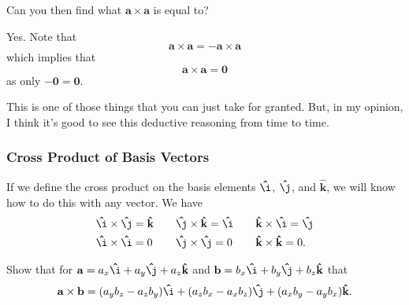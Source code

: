         \begin{question}
        Can you then find what $\mathbf{a}\times \mathbf{a}$ is equal to?
        \end{question}
        
        \begin{question}
        Yes.  Note that
        \[
        \mathbf{a}\times \mathbf{a}=-\mathbf{a}\times \mathbf{a}
        \]
        which implies that
        \[
        \mathbf{a}\times \mathbf{a}=\mathbf{0}
        \]
        as only $-\mathbf{0}=\mathbf{0}.$
        \end{question}
        
        \begin{remark}
        This is one of those things that you can just take for granted. But, in my opinion, I think it's good to see this deductive reasoning from time to time.
        \end{remark}
        
        \subsubsection{Cross Product of Basis Vectors}
        If we define the cross product on the basis elements $\mathbf{\hat{\i}}$, $\mathbf{\hat{\j}}$, and $\mathbf{\hat{k}}$, we will know how to do this with any vector.  We have
        \begin{align*}
            &\mathbf{\hat{\i}}\times \mathbf{\hat{\j}} = \mathbf{\hat{k}} &\quad &\mathbf{\hat{\j}}\times \mathbf{\hat{k}} = \mathbf{\hat{\i}} &\quad
            &\mathbf{\hat{k}}\times \mathbf{\hat{\i}} = \mathbf{\hat{\j}}\\
            &\mathbf{\hat{\i}}\times \mathbf{\hat{\i}} = 0 &\quad
            &\mathbf{\hat{\j}}\times \mathbf{\hat{\j}} = 0 &\quad
            &\mathbf{\hat{k}}\times \mathbf{\hat{k}} = 0.
        \end{align*}
        
        \begin{exercise}
        Show that for $\mathbf{a}=a_x \mathbf{\hat{\i}} + a_y\mathbf{\hat{\j}} + a_z \mathbf{\hat{k}}$ and $\mathbf{b}=b_x \mathbf{\hat{\i}} + b_y\mathbf{\hat{\j}} + b_z \mathbf{\hat{k}}$ that
        \[
        \mathbf{a}\times \mathbf{b} = (a_yb_z-a_zb_y)\mathbf{\hat{\i}} + (a_zb_x-a_xb_z)\mathbf{\hat{\j}}+ (a_xb_y - a_yb_x)\mathbf{\hat{k}}.
        \]
        \end{exercise}
        
